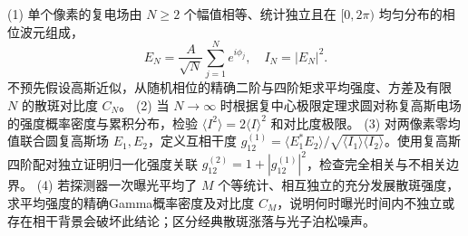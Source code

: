 (1) 单个像素的复电场由 \(N\ge2\) 个幅值相等、统计独立且在 \([0,2\pi)\) 均匀分布的相位波元组成，
\[
E_N=\frac{A}{\sqrt N}\sum_{j=1}^N e^{i\phi_j},\quad I_N=|E_N|^2.
\]
不预先假设高斯近似，从随机相位的精确二阶与四阶矩求平均强度、方差及有限 \(N\) 的散斑对比度 \(C_N\)。
(2) 当 \(N\to\infty\) 时根据复中心极限定理求圆对称复高斯电场的强度概率密度与累积分布，检验 \(\langle I^2\rangle=2\langle I\rangle^2\) 和对比度极限。
(3) 对两像素零均值联合圆复高斯场 \(E_1,E_2\)，定义互相干度 \(g^{(1)}_{12}=\langle E_1^*E_2\rangle/\sqrt{\langle I_1\rangle\langle I_2\rangle}\)。使用复高斯四阶配对独立证明归一化强度关联 \(g^{(2)}_{12}=1+|g^{(1)}_{12}|^2\)，检查完全相关与不相关边界。
(4) 若探测器一次曝光平均了 \(M\) 个等统计、相互独立的充分发展散斑强度，求平均强度的精确Gamma概率密度及对比度 \(C_M\)，说明何时曝光时间内不独立或存在相干背景会破坏此结论；区分经典散斑涨落与光子泊松噪声。
